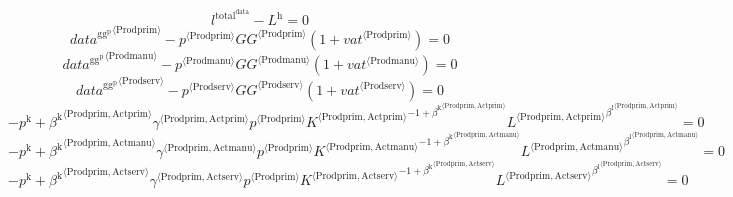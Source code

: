 \begin{equation}
l^{\mathrm{total}^{\mathrm{data}}} - L^{\mathrm{h}} = 0
\end{equation}
\begin{equation}
{{d\!a\!t\!a}^{\mathrm{gg}^{\mathrm{p}}}}^{\langle \mathrm{\mathrm{Prodprim}}\rangle} - {{p}^{\langle \mathrm{Prodprim}\rangle}} {{{G\!G}}^{\langle \mathrm{Prodprim}\rangle}} \left(1 + {{v\!a\!t}}^{\langle \mathrm{\mathrm{Prodprim}}\rangle}\right) = 0
\end{equation}
\begin{equation}
{{d\!a\!t\!a}^{\mathrm{gg}^{\mathrm{p}}}}^{\langle \mathrm{\mathrm{Prodmanu}}\rangle} - {{p}^{\langle \mathrm{Prodmanu}\rangle}} {{{G\!G}}^{\langle \mathrm{Prodmanu}\rangle}} \left(1 + {{v\!a\!t}}^{\langle \mathrm{\mathrm{Prodmanu}}\rangle}\right) = 0
\end{equation}
\begin{equation}
{{d\!a\!t\!a}^{\mathrm{gg}^{\mathrm{p}}}}^{\langle \mathrm{\mathrm{Prodserv}}\rangle} - {{p}^{\langle \mathrm{Prodserv}\rangle}} {{{G\!G}}^{\langle \mathrm{Prodserv}\rangle}} \left(1 + {{v\!a\!t}}^{\langle \mathrm{\mathrm{Prodserv}}\rangle}\right) = 0
\end{equation}
\begin{equation}
-p^{\mathrm{k}} + {{\beta^{\mathrm{k}}}^{\langle \mathrm{\mathrm{Prodprim}},\mathrm{\mathrm{Actprim}}\rangle}} {{\gamma}^{\langle \mathrm{\mathrm{Prodprim}},\mathrm{\mathrm{Actprim}}\rangle}} {{p}^{\langle \mathrm{Prodprim}\rangle}} {{{K}^{\langle \mathrm{Prodprim},\mathrm{Actprim}\rangle}}^{-1 + {\beta^{\mathrm{k}}}^{\langle \mathrm{\mathrm{Prodprim}},\mathrm{\mathrm{Actprim}}\rangle}}} {{{L}^{\langle \mathrm{Prodprim},\mathrm{Actprim}\rangle}}^{{\beta^{\mathrm{l}}}^{\langle \mathrm{\mathrm{Prodprim}},\mathrm{\mathrm{Actprim}}\rangle}}} = 0
\end{equation}
\begin{equation}
-p^{\mathrm{k}} + {{\beta^{\mathrm{k}}}^{\langle \mathrm{\mathrm{Prodprim}},\mathrm{\mathrm{Actmanu}}\rangle}} {{\gamma}^{\langle \mathrm{\mathrm{Prodprim}},\mathrm{\mathrm{Actmanu}}\rangle}} {{p}^{\langle \mathrm{Prodprim}\rangle}} {{{K}^{\langle \mathrm{Prodprim},\mathrm{Actmanu}\rangle}}^{-1 + {\beta^{\mathrm{k}}}^{\langle \mathrm{\mathrm{Prodprim}},\mathrm{\mathrm{Actmanu}}\rangle}}} {{{L}^{\langle \mathrm{Prodprim},\mathrm{Actmanu}\rangle}}^{{\beta^{\mathrm{l}}}^{\langle \mathrm{\mathrm{Prodprim}},\mathrm{\mathrm{Actmanu}}\rangle}}} = 0
\end{equation}
\begin{equation}
-p^{\mathrm{k}} + {{\beta^{\mathrm{k}}}^{\langle \mathrm{\mathrm{Prodprim}},\mathrm{\mathrm{Actserv}}\rangle}} {{\gamma}^{\langle \mathrm{\mathrm{Prodprim}},\mathrm{\mathrm{Actserv}}\rangle}} {{p}^{\langle \mathrm{Prodprim}\rangle}} {{{K}^{\langle \mathrm{Prodprim},\mathrm{Actserv}\rangle}}^{-1 + {\beta^{\mathrm{k}}}^{\langle \mathrm{\mathrm{Prodprim}},\mathrm{\mathrm{Actserv}}\rangle}}} {{{L}^{\langle \mathrm{Prodprim},\mathrm{Actserv}\rangle}}^{{\beta^{\mathrm{l}}}^{\langle \mathrm{\mathrm{Prodprim}},\mathrm{\mathrm{Actserv}}\rangle}}} = 0
\end{equation}
